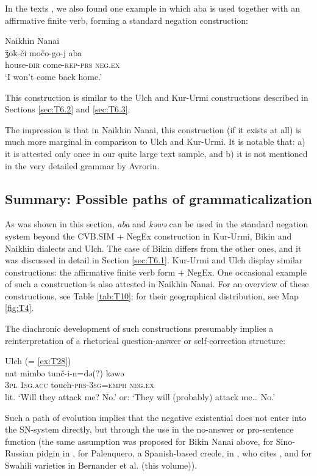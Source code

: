 \documentclass[output=paper]{langscibook}
\begin{document}
In the texts \citep{avrorin1986a}, we also found one example in which aba is used together with an affirmative finite verb, forming a standard negation construction:

\ea Naikhin Nanai \label{ex:T31}\\
	\gll ǯōk-či	močo-go-j	aba\\
	house-\textsc{dir}	come-\textsc{rep-prs}	\textsc{neg.ex}\\
	\glt `I won’t come back home.' \citep[192, text]{avrorin1986a}
\z

This construction is similar to the Ulch and Kur-Urmi constructions described in Sections \ref{sec:T6.2} and \ref{sec:T6.3}.

The impression is that in Naikhin Nanai, this construction (if it exists at all) is much more marginal in comparison to Ulch and Kur-Urmi. It is notable that: a) it is attested only once in our quite large text sample, and b) it is not mentioned in the very detailed grammar by Avrorin.

\subsection{Summary: Possible paths of grammaticalization}\label{sec:T6.5}

As was shown in this section, \textit{aba} and \textit{kəwə} can be used in the standard negation system beyond the CVB.SIM + NegEx construction in Kur-Urmi, Bikin and Naikhin dialects and Ulch. The case of Bikin differs from the other ones, and it was discussed in detail in Section \ref{sec:T6.1}. Kur-Urmi and Ulch display similar constructions: the affirmative finite verb form + NegEx. One occasional example of such a construction is also attested in Naikhin Nanai. For an overview of these constructions, see Table \ref{tab:T10}; for their geographical distribution, see Map \ref{fig:T4}.

The diachronic development of such constructions presumably implies a reinterpretation of a rhetorical question-answer or self-correction structure:

\ea Ulch (= \ref{ex:T28}) \label{ex:}\\
	\gll nat	mimbə	tunč-i-n=də(?)		kəwə\\
	\textsc{3pl}	\textsc{1sg.acc}	touch-\textsc{prs-3sg=emph}	\textsc{neg.ex}\\
	\glt lit. `Will they attack me? No.’ or: `They will (probably) attack me… No.’
\z

Such a path of evolution implies that the negative existential does not enter into the SN-system directly, but through the use in the no-answer or pro-sentence function (the same assumption was proposed for Bikin Nanai above, for Sino-Russian pidgin in \citet[155-156]{Veselinova2016}, for Palenquero, a Spanish-based creole, in \citet[21]{Croft1991}, who cites \citet{Schwegler1988}, and for Swahili varieties in Bernander et al. (this volume)).
\end{document}
